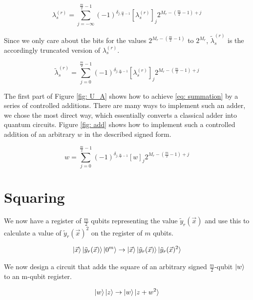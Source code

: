 \begin{equation}
    \lambda^{(r)}_s = \sum_{j = -\infty}^{\frac{m}{2} - 1} (-1)^{\delta_{j, \frac{m}{2} - 1}}[\lambda^{(r)}_s]_j2^{M_r - (\frac{m}{2} - 1) + j}
\end{equation}

Since we only care about the bits for the values $2^{M_r - (\frac{m}{2} - 1)}$ to $2^{M_r}$, $\tilde{\lambda}^{(r)}_s$ is the accordingly truncated version of $\lambda^{(r)}_s$.

\begin{equation}
    \tilde{\lambda}^{(r)}_s = \sum_{j = 0}^{\frac{m}{2} - 1} (-1)^{\delta_{j, \frac{m}{2} - 1}}[\lambda^{(r)}_s]_j2^{M_r - (\frac{m}{2} - 1) + j}
\end{equation}

The first part of Figure \ref{fig: U_A} shows how to achieve \eqref{eq: summation} by a series of controlled additions. There are many ways to implement such an adder, we chose the most direct way, which essentially converts a classical adder into quantum circuits. Figure \ref{fig: add} shows how to implement such a controlled addition of an arbitrary $w$ in the described signed form.

\begin{equation}
    w = \sum_{j = 0}^{\frac{m}{2} - 1} (-1)^{\delta_{j, \frac{m}{2} - 1}}[w]_j2^{M_r - (\frac{m}{2} - 1) + j}
\end{equation}

\section{Squaring}

We now have a register of $\frac{m}{2}$ qubits representing the value $\tilde{y}_r(\vec{x})$ and use this to calculate a value of $\tilde{y}_r(\vec{x})^2$ on the register of $m$ qubits.

\begin{equation}
    \ket{\vec{x}}\ket{\tilde{y}_r(\vec{x})}\ket{0^m} \rightarrow \ket{\vec{x}}\ket{\tilde{y}_r(\vec{x})}\ket{\tilde{y}_r(\vec{x})^2} \label{eq: y^2}
\end{equation}

We now design a circuit that adds the square of an arbitrary signed $\frac{m}{2}$-qubit $\ket{w}$ to an m-qubit register.

\begin{equation}
    \ket{w}\ket{z} \rightarrow \ket{w}\ket{z + w^2}
\end{equation}

